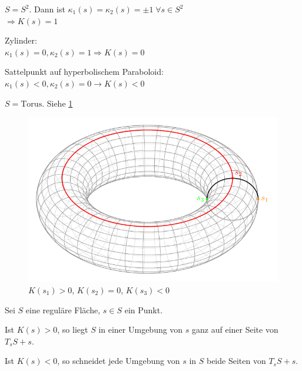 \begin{beispiel}
    \begin{bspenum}
        \item $S = S^2$. Dann ist $\kappa_1(s) = \kappa_2(s) = \pm 1\;\forall s \in S^2$\\
              $\Rightarrow K(s) = 1$
        \item Zylinder:\\
              $\kappa_1(s) = 0, \kappa_2(s) = 1 \Rightarrow K(s) = 0$
        \item Sattelpunkt auf hyperbolischem Paraboloid:\\
              $\kappa_1(s) < 0, \kappa_2(s) = 0 \rightarrow K(s) < 0$
        \item $S = \text{Torus}$. Siehe \cref{fig:torus-gauss-kruemmung}\\
            \begin{figure}[htp]
                \centering
                \includegraphics[width=0.95\linewidth, keepaspectratio]{figures/torus-gauss-kruemmung.pdf}
                \caption{$K(s_1) > 0$, $K(s_2) = 0$, $K(s_3) < 0$}
                \label{fig:torus-gauss-kruemmung}
            \end{figure}
    \end{bspenum}
\end{beispiel}

\begin{bemerkung}%
    Sei $S$ eine reguläre Fläche, $s \in S$ ein Punkt.
    \begin{bemenum}
        \item Ist $K(s) > 0$, so liegt $S$ in einer Umgebung von $s$
              ganz auf einer Seite von $T_s S + s$.
        \item Ist $K(s) < 0$, so schneidet jede Umgebung von $s$ in $S$
              beide Seiten von $T_s S + s$.
    \end{bemenum}
\end{bemerkung}
